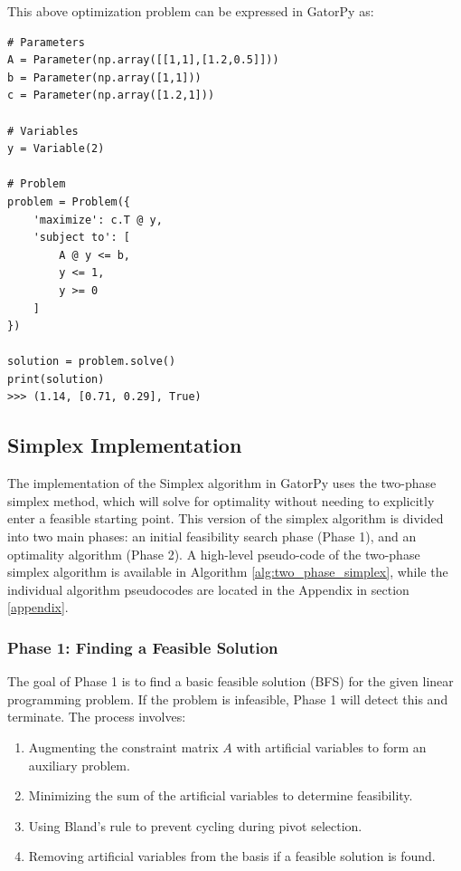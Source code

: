 \documentclass[conference]{IEEEtran}
\begin{document}
This above optimization problem can be expressed in GatorPy as:
\begin{lstlisting}[style=mypython, caption={Solving a Linear Program Symbolically}]
# Parameters
A = Parameter(np.array([[1,1],[1.2,0.5]]))
b = Parameter(np.array([1,1]))
c = Parameter(np.array([1.2,1]))

# Variables
y = Variable(2)

# Problem
problem = Problem({
    'maximize': c.T @ y,
    'subject to': [
        A @ y <= b,
        y <= 1,
        y >= 0
    ]
})

solution = problem.solve()
print(solution)
>>> (1.14, [0.71, 0.29], True)
\end{lstlisting}

\subsection{Simplex Implementation}
\label{Simplex}
The implementation of the Simplex algorithm in GatorPy uses  the two-phase simplex method, which will solve for optimality without needing to explicitly enter a feasible starting point.
This version of the simplex algorithm is divided into two main phases: an initial feasibility search phase (Phase 1), and an optimality algorithm (Phase 2). 
A high-level pseudo-code of the two-phase simplex algorithm is available in Algorithm \ref{alg:two_phase_simplex}, while the individual algorithm pseudocodes are located in the Appendix in section \ref{appendix}.


\subsubsection{Phase 1: Finding a Feasible Solution}
The goal of Phase 1 is to find a basic feasible solution (BFS) for the given linear programming problem. If the problem is infeasible, Phase 1 will detect this and terminate. The process involves:
\begin{enumerate}
    \item Augmenting the constraint matrix \( A \) with artificial variables to form an auxiliary problem.
    \item Minimizing the sum of the artificial variables to determine feasibility.
    \item Using Bland's rule to prevent cycling during pivot selection.
    \item Removing artificial variables from the basis if a feasible solution is found.
\end{enumerate}
\end{document}
